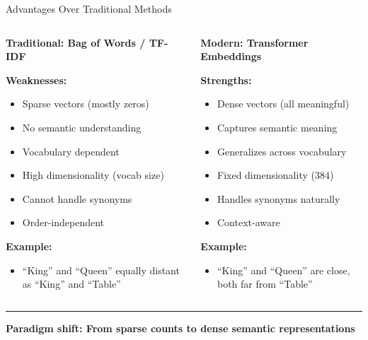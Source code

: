 \documentclass[8pt,aspectratio=169]{beamer}
\newcommand{\bottomnote}[1]{%
\vfill
\vspace{-2mm}
\textcolor{mllavender2}{\rule{\textwidth}{0.4pt}}
\vspace{1mm}
\footnotesize
\textbf{#1}
}
\begin{document}
\begin{frame}[t]{Advantages Over Traditional Methods}

\begin{columns}[t]
\begin{column}{0.48\textwidth}
\textbf{Traditional: Bag of Words / TF-IDF}

\vspace{0.3cm}

\textbf{Weaknesses:}
\begin{itemize}
    \item \textcolor{mlred}{Sparse vectors} (mostly zeros)
    \item \textcolor{mlred}{No semantic understanding}
    \item \textcolor{mlred}{Vocabulary dependent}
    \item \textcolor{mlred}{High dimensionality} (vocab size)
    \item \textcolor{mlred}{Cannot handle synonyms}
    \item \textcolor{mlred}{Order-independent}
\end{itemize}

\vspace{0.3cm}

\textbf{Example:}
\begin{itemize}
    \item ``King'' and ``Queen'' equally distant as ``King'' and ``Table''
\end{itemize}
\end{column}

\begin{column}{0.48\textwidth}
\textbf{Modern: Transformer Embeddings}

\vspace{0.3cm}

\textbf{Strengths:}
\begin{itemize}
    \item \textcolor{mlgreen}{Dense vectors} (all meaningful)
    \item \textcolor{mlgreen}{Captures semantic meaning}
    \item \textcolor{mlgreen}{Generalizes across vocabulary}
    \item \textcolor{mlgreen}{Fixed dimensionality} (384)
    \item \textcolor{mlgreen}{Handles synonyms naturally}
    \item \textcolor{mlgreen}{Context-aware}
\end{itemize}

\vspace{0.3cm}

\textbf{Example:}
\begin{itemize}
    \item ``King'' and ``Queen'' are close, both far from ``Table''
\end{itemize}
\end{column}
\end{columns}

\bottomnote{Paradigm shift: From sparse counts to dense semantic representations}
\end{frame}
\end{document}
